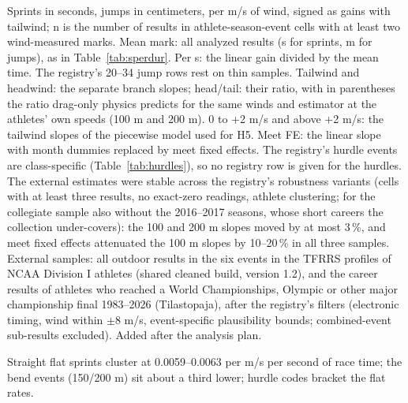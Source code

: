 \documentclass[12pt,a4paper]{article}
\begin{document}
\begin{table}[H]
\centering
\caption{The elite end with the same estimator: wind effects in US collegiate results (TFRRS) and in the career results of championship finalists (Tilastopaja), with the registry's all-age and senior rows as reference (within athlete $\times$ season; 95\,\% CIs and SEs clustered on meet).}
\label{tab:selite}
\scriptsize
\resizebox{\textwidth}{!}{}
\vspace{0.2em}
\parbox{0.97\textwidth}{\footnotesize Sprints in seconds, jumps in centimeters, per m/s of wind, signed as gains with tailwind; n is the number of results in athlete-season-event cells with at least two wind-measured marks. Mean mark: all analyzed results (s for sprints, m for jumps), as in Table~\ref{tab:sperdur}. Per s: the linear gain divided by the mean time. The registry's 20--34 jump rows rest on thin samples. Tailwind and headwind: the separate branch slopes; head/tail: their ratio, with in parentheses the ratio drag-only physics predicts for the same winds and estimator at the athletes' own speeds (100 m and 200 m). 0 to +2 m/s and above +2 m/s: the tailwind slopes of the piecewise model used for H5. Meet FE: the linear slope with month dummies replaced by meet fixed effects. The registry's hurdle events are class-specific (Table~\ref{tab:hurdles}), so no registry row is given for the hurdles. The external estimates were stable across the registry's robustness variants (cells with at least three results, no exact-zero readings, athlete clustering; for the collegiate sample also without the 2016--2017 seasons, whose short careers the collection under-covers): the 100 and 200 m slopes moved by at most 3\,\%, and meet fixed effects attenuated the 100 m slopes by 10--20\,\% in all three samples. External samples: all outdoor results in the six events in the TFRRS profiles of NCAA Division I athletes (shared cleaned build, version 1.2), and the career results of athletes who reached a World Championships, Olympic or other major championship final 1983--2026 (Tilastopaja), after the registry's filters (electronic timing, wind within $\pm$8 m/s, event-specific plausibility bounds; combined-event sub-results excluded). Added after the analysis plan.}
\end{table}

\begin{table}[H]
\centering
\caption{Effect per second of race time: gain per +1 m/s divided by mean race duration, flat sprints and short hurdles.}
\label{tab:sperdur}
\footnotesize

\vspace{0.2em}
\parbox{0.8\textwidth}{\footnotesize Straight flat sprints cluster at 0.0059--0.0063 per m/s per second of race time; the bend events (150/200 m) sit about a third lower; hurdle codes bracket the flat rates.}
\end{table}
\end{document}
